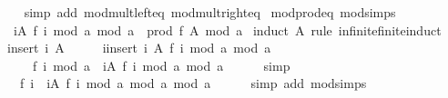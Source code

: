 \begin{isabellebody}
%
\isadelimproof
\ \ %
\endisadelimproof
%
\isatagproof
{}\isamarkupfalse%
\ {\isacharparenleft}{\kern0pt}simp\ add{\isacharcolon}{\kern0pt}\ mod{\isacharunderscore}{\kern0pt}mult{\isacharunderscore}{\kern0pt}left{\isacharunderscore}{\kern0pt}eq\ mod{\isacharunderscore}{\kern0pt}mult{\isacharunderscore}{\kern0pt}right{\isacharunderscore}{\kern0pt}eq{\isacharparenright}{\kern0pt}%
\endisatagproof
{\isafoldproof}%
%
\isadelimproof
\isanewline
%
\endisadelimproof
\isanewline
{}\isamarkupfalse%
\ mod{\isacharunderscore}{\kern0pt}prod{\isacharunderscore}{\kern0pt}eq\ {\isacharbrackleft}{\kern0pt}mod{\isacharunderscore}{\kern0pt}simps{\isacharbrackright}{\kern0pt}{\isacharcolon}{\kern0pt}\isanewline
\ \ {\isachardoublequoteopen}{\isacharparenleft}{\kern0pt}{\isasymProd}i{\isasymin}A{\isachardot}{\kern0pt}\ f\ i\ mod\ a{\isacharparenright}{\kern0pt}\ mod\ a\ {\isacharequal}{\kern0pt}\ prod\ f\ A\ mod\ a{\isachardoublequoteclose}\isanewline
%
\isadelimproof
%
\endisadelimproof
%
\isatagproof
{}\isamarkupfalse%
\ {\isacharparenleft}{\kern0pt}induct\ A\ rule{\isacharcolon}{\kern0pt}\ infinite{\isacharunderscore}{\kern0pt}finite{\isacharunderscore}{\kern0pt}induct{\isacharparenright}{\kern0pt}\isanewline
\ \ \isamarkupfalse%
\ {\isacharparenleft}{\kern0pt}insert\ i\ A{\isacharparenright}{\kern0pt}\isanewline
\ \ \isamarkupfalse%
\ \isamarkupfalse%
\ {\isachardoublequoteopen}{\isacharparenleft}{\kern0pt}{\isasymProd}i{\isasymin}insert\ i\ A{\isachardot}{\kern0pt}\ f\ i\ mod\ a{\isacharparenright}{\kern0pt}\ mod\ a\isanewline
\ \ \ \ {\isacharequal}{\kern0pt}\ {\isacharparenleft}{\kern0pt}f\ i\ mod\ a\ {\isacharasterisk}{\kern0pt}\ {\isacharparenleft}{\kern0pt}{\isasymProd}i{\isasymin}A{\isachardot}{\kern0pt}\ f\ i\ mod\ a{\isacharparenright}{\kern0pt}{\isacharparenright}{\kern0pt}\ mod\ a{\isachardoublequoteclose}\isanewline
\ \ \ \ \isamarkupfalse%
\ simp\isanewline
\ \ \isamarkupfalse%
\ \isamarkupfalse%
\ {\isachardoublequoteopen}{\isasymdots}\ {\isacharequal}{\kern0pt}\ {\isacharparenleft}{\kern0pt}f\ i\ {\isacharasterisk}{\kern0pt}\ {\isacharparenleft}{\kern0pt}{\isacharparenleft}{\kern0pt}{\isasymProd}i{\isasymin}A{\isachardot}{\kern0pt}\ f\ i\ mod\ a{\isacharparenright}{\kern0pt}\ mod\ a{\isacharparenright}{\kern0pt}{\isacharparenright}{\kern0pt}\ mod\ a{\isachardoublequoteclose}\isanewline
\ \ \ \ \isamarkupfalse%
\ {\isacharparenleft}{\kern0pt}simp\ add{\isacharcolon}{\kern0pt}\ mod{\isacharunderscore}{\kern0pt}simps{\isacharparenright}{\kern0pt}\isanewline

\end{isabellebody}
